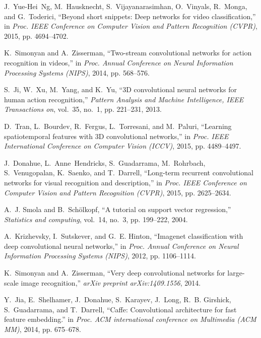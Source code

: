 \documentclass[10pt, a4paper, conference]{IEEEtran}
\begin{document}
\begin{thebibliography}{10}
J.~Yue-Hei~Ng, M.~Hausknecht, S.~Vijayanarasimhan, O.~Vinyals, R.~Monga, and
  G.~Toderici, ``Beyond short snippets: Deep networks for video
  classification,'' in \emph{Proc. IEEE Conference on Computer Vision and
  Pattern Recognition (CVPR)}, 2015, pp. 4694--4702.

K.~Simonyan and A.~Zisserman, ``Two-stream convolutional networks for action
  recognition in videos,'' in \emph{Proc. Annual Conference on Neural
  Information Processing Systems (NIPS)}, 2014, pp. 568--576.

S.~Ji, W.~Xu, M.~Yang, and K.~Yu, ``{3D} convolutional neural networks for
  human action recognition,'' \emph{Pattern Analysis and Machine Intelligence,
  IEEE Transactions on}, vol.~35, no.~1, pp. 221--231, 2013.

D.~Tran, L.~Bourdev, R.~Fergus, L.~Torresani, and M.~Paluri, ``Learning
  spatiotemporal features with {3D} convolutional networks,'' in \emph{Proc.
  IEEE International Conference on Computer Vision (ICCV)}, 2015, pp.
  4489--4497.

J.~Donahue, L.~Anne~Hendricks, S.~Guadarrama, M.~Rohrbach, S.~Venugopalan,
  K.~Saenko, and T.~Darrell, ``Long-term recurrent convolutional networks for
  visual recognition and description,'' in \emph{Proc. IEEE Conference on
  Computer Vision and Pattern Recognition (CVPR)}, 2015, pp. 2625--2634.

A.~J. Smola and B.~Sch{\"o}lkopf, ``A tutorial on support vector regression,''
  \emph{Statistics and computing}, vol.~14, no.~3, pp. 199--222, 2004.

A.~Krizhevsky, I.~Sutskever, and G.~E. Hinton, ``Imagenet classification with
  deep convolutional neural networks,'' in \emph{Proc. Annual Conference on
  Neural Information Processing Systems (NIPS)}, 2012, pp. 1106--1114.

K.~Simonyan and A.~Zisserman, ``Very deep convolutional networks for
  large-scale image recognition,'' \emph{arXiv preprint arXiv:1409.1556}, 2014.

Y.~Jia, E.~Shelhamer, J.~Donahue, S.~Karayev, J.~Long, R.~B. Girshick,
  S.~Guadarrama, and T.~Darrell, ``Caffe: Convolutional architecture for fast
  feature embedding.'' in \emph{Proc. ACM international conference on
  Multimedia (ACM MM)}, 2014, pp. 675--678.


\end{thebibliography}
\end{document}
